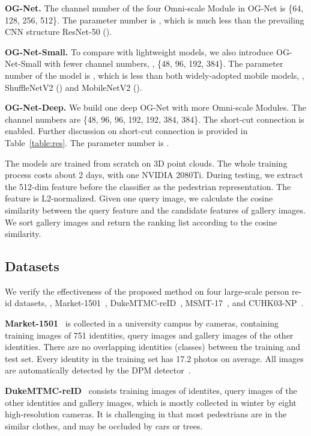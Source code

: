 \noindent\textbf{OG-Net.} The channel number of the four Omni-scale Module in OG-Net is \{64, 128, 256, 512\}. The parameter number is \textbf{}, which is much less than the prevailing CNN structure ResNet-50 (). 

\noindent\textbf{OG-Net-Small.} To compare with lightweight models, we also introduce OG-Net-Small with fewer channel numbers, \ie, \{48, 96, 192, 384\}. The parameter number of the model is \textbf{}, which is less than both widely-adopted mobile models, \ie, ShuffleNetV2 () and MobileNetV2 (). 

\noindent\textbf{OG-Net-Deep.} We build one deep OG-Net with more Omni-scale Modules. The channel numbers are \{48, 96, 96, 192, 192, 384, 384\}. The short-cut connection is enabled. Further discussion on short-cut connection is provided in Table~\ref{table:res}.  The parameter number is . 

The models are trained from scratch on 3D point clouds. The whole training process costs about 2 days, with one NVIDIA 2080Ti. During testing, we extract the 512-dim feature before the classifier as the pedestrian representation. The feature is L2-normalized. Given one query image, we calculate the cosine similarity between the query feature and the candidate features of gallery images. We sort gallery images and return the ranking list according to the cosine similarity. 

\subsection{Datasets} 
We verify the effectiveness of the proposed method on four large-scale person re-id datasets, \ie, Market-1501~\cite{zheng2015scalable}, DukeMTMC-reID~\cite{ristani2016performance,zheng2017unlabeled},  MSMT-17~\cite{wei2018person}, and CUHK03-NP~\cite{li2014deepreid,zhong2017re}. 

\textbf{Market-1501}~\cite{zheng2015scalable} is collected in a university campus by  cameras, containing  training images of 751 identities,  query images and  gallery images of the other  identities. There are no overlapping identities (classes) between the training and test set. Every identity in the training set
has 17.2 photos on average. All images are automatically detected by the DPM detector~\cite{felzenszwalb2009object}.

\textbf{DukeMTMC-reID}~\cite{ristani2016performance,zheng2017unlabeled} consists  training images of  identites,  query images of the other  identities and  gallery images, which is mostly collected in winter by eight high-resolution cameras. It is challenging in that most pedestrians are in the similar clothes, and may be occluded by cars or trees.

